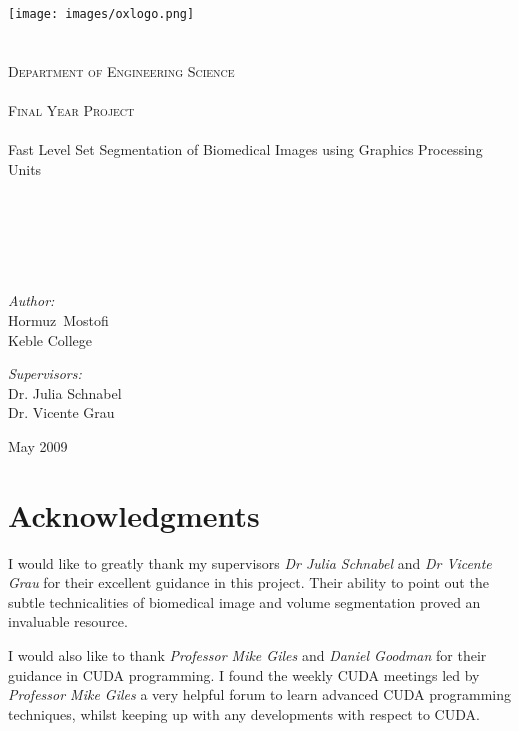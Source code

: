 \documentclass[a4paper,oneside,11pt]{book}
\begin{document}
\frontmatter
\begin{titlepage}
\begin{center}
\texttt{[image: images/oxlogo.png]}\\
\ \\ %
\ \\
\textsc{\Large 
%
Department of Engineering Science\\
\ \\
Final Year Project\\
\ \\}
{\LARGE 
Fast Level Set Segmentation of Biomedical Images using Graphics Processing Units
\\}
\ \\
\ \\
\ \\
\ \\
\ \\
\begin{minipage}{0.4\textwidth}
\begin{flushleft} \large
\emph{Author:}\\
Hormuz~Mostofi\\
Keble College
\end{flushleft}
\end{minipage}
%
\begin{minipage}{0.4\textwidth}
\begin{flushright} \large 
\emph{Supervisors:} \\
Dr. Julia Schnabel\\
Dr. Vicente Grau
\end{flushright}
\end{minipage}

\vfill
{\large {May 2009}}
\end{center}
\end{titlepage}




\section*{Acknowledgments} 
I would like to greatly thank my supervisors \textit{Dr Julia Schnabel} and \textit{Dr Vicente Grau} for their excellent guidance in this project. Their ability to point out the subtle technicalities of biomedical image and volume segmentation proved an invaluable resource. 

I would also like to thank \textit{Professor Mike Giles} and \textit{Daniel Goodman} for their guidance in CUDA programming. I found the weekly CUDA meetings led by \textit{Professor Mike Giles} a very helpful forum to learn advanced CUDA programming techniques, whilst keeping up with any developments with respect to CUDA. 
\end{document}
